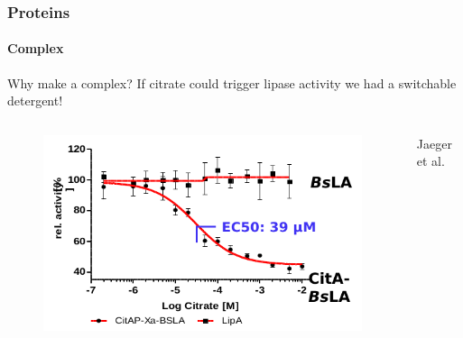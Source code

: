 \documentclass[english]{beamer}
\begin{document}

\begin{frame}
    \frametitle{Proteins}
    \framesubtitle{Complex}


    \begin{block}{Why make a complex?}
        If citrate could trigger lipase activity we had a switchable detergent!
    \end{block}

    \pause

    \begin{columns}[t]
        \vspace{-3ex}
        \begin{figure}
            \includegraphics[width=.7\linewidth]{figures/complex/dose_response_curve.png}
        \end{figure}       
        \vfill

        \tiny
        Jaeger et al.
    \end{columns}

\end{frame}  

\end{document}
